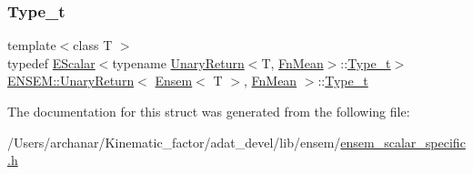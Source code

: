 \subsubsection{\texorpdfstring{Type\_t}{Type\_t}\hspace{0.1cm}{\footnotesize\ttfamily [2/2]}}
{\footnotesize\ttfamily template$<$class T $>$ \\
typedef \mbox{\hyperlink{classENSEM_1_1EScalar}{E\+Scalar}}$<$typename \mbox{\hyperlink{structENSEM_1_1UnaryReturn}{Unary\+Return}}$<$T, \mbox{\hyperlink{structENSEM_1_1FnMean}{Fn\+Mean}}$>$\+::\mbox{\hyperlink{structENSEM_1_1UnaryReturn_3_01Ensem_3_01T_01_4_00_01FnMean_01_4_aecb00ba039f774eb3f7e9c0d788867a6}{Type\+\_\+t}}$>$ \mbox{\hyperlink{structENSEM_1_1UnaryReturn}{E\+N\+S\+E\+M\+::\+Unary\+Return}}$<$ \mbox{\hyperlink{classENSEM_1_1Ensem}{Ensem}}$<$ T $>$, \mbox{\hyperlink{structENSEM_1_1FnMean}{Fn\+Mean}} $>$\+::\mbox{\hyperlink{structENSEM_1_1UnaryReturn_3_01Ensem_3_01T_01_4_00_01FnMean_01_4_aecb00ba039f774eb3f7e9c0d788867a6}{Type\+\_\+t}}}



The documentation for this struct was generated from the following file\+:\begin{DoxyCompactItemize}
\item 
/\+Users/archanar/\+Kinematic\+\_\+factor/adat\+\_\+devel/lib/ensem/\mbox{\hyperlink{lib_2ensem_2ensem__scalar__specific_8h}{ensem\+\_\+scalar\+\_\+specific.\+h}}\end{DoxyCompactItemize}
